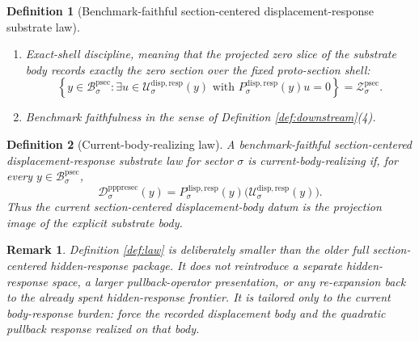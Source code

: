 \documentclass[11pt]{article}
\newcommand{\ProtoSectionBody}[1]{\mathcal B_{#1}^{\mathrm{psec}}}
\newcommand{\ProtoSectionShell}[1]{\mathcal Z_{#1}^{\mathrm{psec}}}
\newcommand{\PrePreProtoSectionVertical}[1]{V_{#1}^{\mathrm{pppresec}}}
\newcommand{\PrePreProtoSectionResidualBody}[1]{\mathcal D_{#1}^{\mathrm{pppresec}}}
\newcommand{\SubstrateCarrier}[1]{U_{#1}^{\mathrm{disp,resp}}}
\newcommand{\SubstrateBody}[1]{\mathcal U_{#1}^{\mathrm{disp,resp}}}
\newcommand{\SubstrateProjection}[1]{P_{#1}^{\mathrm{disp,resp}}}
\newcommand{\SubstrateOperator}[1]{K_{#1}^{\mathrm{disp,resp}}}
\newcommand{\SubstrateLift}[1]{J_{#1}^{\mathrm{disp,resp}}}
\newcommand{\SubstrateKernel}[1]{N_{#1}^{\mathrm{disp,resp}}}
\newtheorem{definition}{Definition}
\newtheorem{remark}{Remark}
\begin{document}
\begin{definition}[Benchmark-faithful section-centered displacement-response substrate law]
\begin{enumerate}
\begin{enumerate}
\[        =
        \mathrm{id}_{\PrePreProtoSectionVertical{\sigma}};
        \]
        \item every \(u\in\SubstrateCarrier{\sigma}\) admits the unique decomposition
        \[
        u
        =
        \SubstrateLift{\sigma}(y)\bigl(\SubstrateProjection{\sigma}(y)u\bigr)
        +
        k,
        \qquad
        k\in\SubstrateKernel{\sigma}(y)\equiv\ker\SubstrateProjection{\sigma}(y);
        \]
        \item the lift is \(\SubstrateOperator{\sigma}(y)\)-orthogonal to the kernel, namely
        \[
        \ev{
        \SubstrateLift{\sigma}(y)v,
        \SubstrateOperator{\sigma}(y)k
        }
        =
        0
        \]
        for every \(v\in\PrePreProtoSectionVertical{\sigma}\) and every \(k\in\SubstrateKernel{\sigma}(y)\).
    \end{enumerate}
    \item Exact-shell discipline, meaning that the projected zero slice of the substrate body records exactly the zero section over the fixed proto-section shell:
    \[
    \left\{
    y\in\ProtoSectionBody{\sigma}:
    \exists u\in\SubstrateBody{\sigma}(y)
    \text{ with }
    \SubstrateProjection{\sigma}(y)u=0
    \right\}
    =
    \ProtoSectionShell{\sigma}.
    \]
    \item Benchmark faithfulness in the sense of Definition \ref{def:downstream}(4).
\end{enumerate}
\end{definition}

\begin{definition}[Current-body-realizing law]
\label{def:realizing}
A benchmark-faithful section-centered displacement-response substrate law for sector \(\sigma\) is \emph{current-body-realizing} if, for every \(y\in\ProtoSectionBody{\sigma}\),
\begin{equation}
\PrePreProtoSectionResidualBody{\sigma}(y)
=
\SubstrateProjection{\sigma}(y)\bigl(\SubstrateBody{\sigma}(y)\bigr).
\label{eq:realizing}
\end{equation}
Thus the current section-centered displacement-body datum is the projection image of the explicit substrate body.
\end{definition}

\begin{remark}
Definition \ref{def:law} is deliberately smaller than the older full section-centered hidden-response package. It does not reintroduce a separate hidden-response space, a larger pullback-operator presentation, or any re-expansion back to the already spent hidden-response frontier. It is tailored only to the current body-response burden: force the recorded displacement body and the quadratic pullback response realized on that body.
\end{remark}
\end{document}
